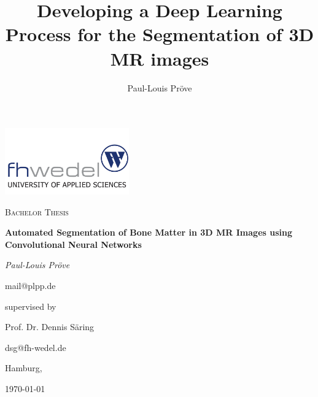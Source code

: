 \documentclass[11pt, a4paper]{article}
\title{Developing a Deep Learning Process for the Segmentation of 3D MR images}
\author{Paul-Louis Pröve}
\begin{document}
    \begin{titlepage}
    \centering
    \includegraphics[width=0.4\textwidth]{imgs/fhw.png}\par
    \vspace{1cm}
    {\scshape\Large Bachelor Thesis\par}
    \vspace{2cm}
    {\bfseries\Huge Automated Segmentation of Bone Matter in 3D MR Images using Convolutional Neural Networks\par}
    \vspace{2cm}
    {\itshape\Large Paul-Louis Pröve\par}
    mail@plpp.de\par
    \vfill
    supervised by\par
    Prof. Dr. Dennis Säring\par
    dsg@fh-wedel.de\par
    \vspace{1cm}
    Hamburg,\par \today\par
    \end{titlepage}



\tableofcontents
\newpage











\end{document}
